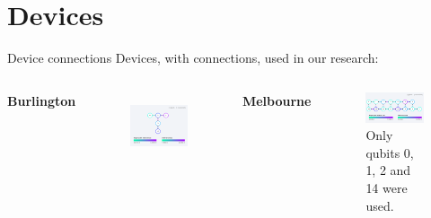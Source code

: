 \section{Devices}

\begin{frame}{Device connections} Devices, with connections, used in our
research: \vspace{0.5cm}

\begin{columns}[T]  \centering \textbf{Burlington}
  \begin{figure}[h] \centering
    \includegraphics[width=\textwidth]{images/connection_diagram_burlington.png}
    \label{fig:burlington_connections}
  \end{figure}

   \centering \textbf{Melbourne}
  \begin{figure}[h] \centering
    \includegraphics[width=\textwidth]{images/connection_diagram_melbourne.png}
    \caption*{\tiny Only qubits 0, 1, 2 and 14 were used.}
    \label{fig:melbourne_connections}
  \end{figure}


\end{columns}
\end{frame}
